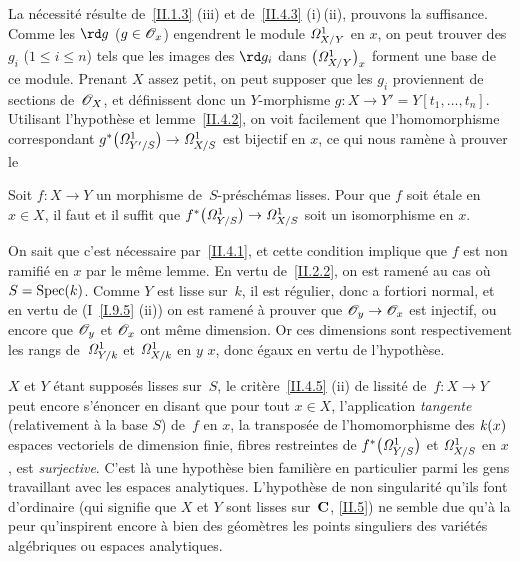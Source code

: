 La n\'ecessit\'e r\'esulte de~\ref{II.1.3} (iii) et
de~\ref{II.4.3} (i)\,(ii), prouvons la suffisance. Comme les
$\rd g$ ($g\in\cal{O}_{x}$) engendrent le module
$\it{\Omega}^1_{X/Y}$ en $x$, on peut trouver des
$g_{i}$ ($1\le i\le n$) tels que les images des $\rd g_{i}$ dans
$\big(\it{\Omega}^1_{X/Y}\big)_{x}$ forment une base de ce
module. Prenant $X$ assez petit, on peut supposer que les $g_{i}$
proviennent de sections de~$\cal{O}_{X}$, et d\'efinissent donc un
$Y$-morphisme $g\colon X\to Y'=Y[t_{1},\dots,t_{n}]$. Utilisant
l'hypoth\`ese et lemme~\ref{II.4.2}, on voit facilement que
l'homomorphisme correspondant
$g^*\big(\it{\Omega}^1_{Y'/S}\big)\to\it{\Omega}^1_{X/S}$ est
bijectif en $x$, ce qui nous ram\`ene \`a prouver le

\begin{corollaire}
\label{II.4.6}
Soit $f\colon X\to Y$ un morphisme de~$S$-pr\'esch\'emas
lisses. Pour que $f$ soit \'etale en $x\in X$, il faut et il suffit
que $f^*\big(\it{\Omega}^1_{Y/S}\big)\to\it{\Omega}^1_{X/S}$ soit
un isomorphisme en $x$.
\end{corollaire}

On sait que c'est n\'ecessaire par~\ref{II.4.1}, et cette condition
implique que $f$ est non ramifi\'e en $x$ par le m\^eme lemme. En
vertu de~\ref{II.2.2}, on est ramen\'e au cas o\`u
$S=\Spec(k)$. Comme $Y$ est lisse sur~$k$, il est r\'egulier, donc a
fortiori normal, et en vertu de (I~\ref{I.9.5} (ii)) on est ramen\'e
\`a prouver que $\cal{O}_{y}\to\cal{O}_{x}$ est injectif, ou encore
que $\cal{O}_{y}$ et $\cal{O}_{x}$ ont m\^eme dimension. Or ces
dimensions sont respectivement les rangs de~$\it{\Omega}^1_{Y/k}$ et
$\it{\Omega}^1_{X/k}$ en $y$ \resp $x$, donc \'egaux en vertu de
l'hypoth\`ese.
\begin{remarques}
\label{II.4.7}
$X$ et $Y$ \'etant suppos\'es lisses sur~$S$, le
crit\`ere~\ref{II.4.5} (ii) de lissit\'e de~$f\colon X\to Y$ peut
encore s'\'enoncer en disant que pour tout $x\in X$, l'application
\emph{tangente} (relativement \`a la base $S$) de~$f$ en $x$,
\ie la transpos\'ee de l'homomorphisme des $\kres(x)$ espaces vectoriels
de dimension finie, fibres restreintes de
$f^*\big(\it{\Omega}^1_{Y/S}\big)$ et $\it{\Omega}^1_{X/S}$ en
$x$, est \emph{surjective}. C'est l\`a une hypoth\`ese bien
famili\`ere en particulier parmi les gens travaillant avec les
espaces analytiques. L'hypoth\`ese de non singularit\'e qu'ils
font d'ordinaire (qui signifie que $X$ et $Y$ sont \og lisses sur~$\CC$\fg, \cf \No \ref{II.5}) ne semble due qu'\`a la peur qu'inspirent
encore \`a bien des g\'eom\`etres les points singuliers des
vari\'et\'es alg\'ebriques ou espaces analytiques.
\end{remarques}

